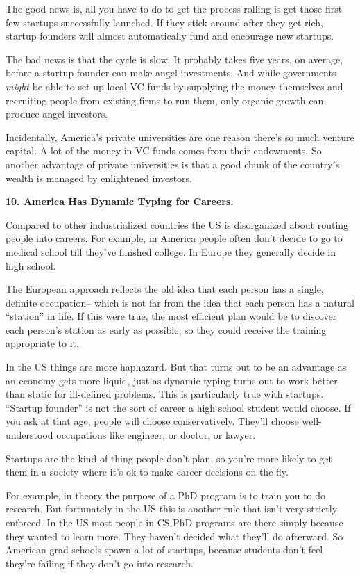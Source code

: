 \documentclass[12pt]{book}
\begin{document}
The good news is, all you have to do to get the process rolling is get
those first few startups successfully launched. If they stick around
after they get rich, startup founders will almost automatically fund and
encourage new startups.

The bad news is that the cycle is slow. It probably takes five years, on
average, before a startup founder can make angel investments. And while
governments \emph{might} be able to set up local VC funds by supplying
the money themselves and recruiting people from existing firms to run
them, only organic growth can produce angel investors.

Incidentally, America's private universities are one reason there's so
much venture capital. A lot of the money in VC funds comes from their
endowments. So another advantage of private universities is that a good
chunk of the country's wealth is managed by enlightened investors.

\textbf{10. America Has Dynamic Typing for Careers.}

Compared to other industrialized countries the US is disorganized about
routing people into careers. For example, in America people often don't
decide to go to medical school till they've finished college. In Europe
they generally decide in high school.

The European approach reflects the old idea that each person has a
single, definite occupation-- which is not far from the idea that each
person has a natural ``station'' in life. If this were true, the most
efficient plan would be to discover each person's station as early as
possible, so they could receive the training appropriate to it.

In the US things are more haphazard. But that turns out to be an
advantage as an economy gets more liquid, just as dynamic typing turns
out to work better than static for ill-defined problems. This is
particularly true with startups. ``Startup founder'' is not the sort of
career a high school student would choose. If you ask at that age,
people will choose conservatively. They'll choose well-understood
occupations like engineer, or doctor, or lawyer.

Startups are the kind of thing people don't plan, so you're more likely
to get them in a society where it's ok to make career decisions on the
fly.

For example, in theory the purpose of a PhD program is to train you to
do research. But fortunately in the US this is another rule that isn't
very strictly enforced. In the US most people in CS PhD programs are
there simply because they wanted to learn more. They haven't decided
what they'll do afterward. So American grad schools spawn a lot of
startups, because students don't feel they're failing if they don't go
into research.
\end{document}
